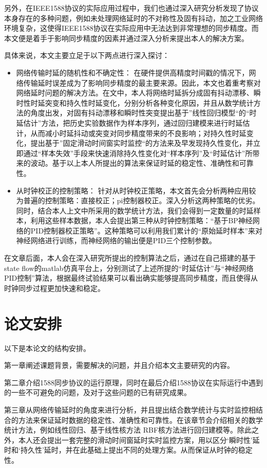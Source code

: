 另外，在IEEE1588协议的实际应用过程中，我们也通过深入研究分析发现了协议本身存在的多种问题，例如未处理网络延时的不对称性及固有抖动，加之工业网络环境复杂，这使得IEEE1588协议在实际应用中无法达到非常理想的同步精度。而本文便是着手于影响同步精度的因素并通过深入分析来提出本人的解决方案。

具体来说，本文主要立足于以下两点进行深入探讨：
\begin{itemize}[noitemsep,topsep=0pt,parsep=0pt,partopsep=0pt]
	\item 网络传输时延的随机性和不确定性：
在硬件提供高精度时间戳的情况下，网络传输延时误差成为了影响同步精度的最主要来源。因此，本文也着重考察对网络延时问题的解决方法。在文中，本人将网络时延拆分成固有抖动漂移、瞬时性时延突变和持久性时延变化，分别分析各种变化原因，并且从数学统计方法的角度出发，对固有抖动漂移和瞬时性突变提出基于”线性回归模型“的“时延估计”方法，把历史实验数据作为样本序列，通过回归建模来进行时延估计，从而减小时延抖动或突变对同步精度带来的不良影响；对持久性时延变化，提出基于”固定滑动时间窗实时监控“的方法来及早发现持久性变化，并立即通过“样本失效”手段来快速消除持久性变化对“样本序列”及“时延估计”所带来的波动。基于以上本人所提出的算法来保证时延的稳定性、准确性和可靠性。
	\item 从时钟校正的控制策略：
针对从时钟校正策略，本文首先会分析两种应用较为普遍的控制策略：直接校正；pi控制器校正。深入分析这两种策略的优劣。同时，结合本人上文中所采用的数学统计方法，我们会得到一定数量的时延样本，利用这些样本数据，本人会提出第三种从时钟控制策略：“基于BP神经网络的PID控制器校正策略”。这种策略可以利用我们累计的“原始延时样本”来对神经网络进行训练，而神经网络的输出便是PID三个控制参数。
\end{itemize}

在文章后面，本人会在深入研究所提出的控制算法之后，通过在自己搭建的基于state flow的matlab仿真平台上，分别测试了上述所提的“时延估计”与“神经网络PID控制”算法，根据最终试验结果可以看出确实能够提高同步精度，而且使得从时钟同步过程更加快速和稳定。

\section{论文安排}
以下是本论文的结构安排。

第一章阐述课题背景，需要解决的问题，并且介绍本文主要研究的内容。

第二章介绍1588同步协议的运行原理，同时在最后介绍1588协议在实际运行中遇到的一些不可避免的问题，及对于这些问题的已有研究成果。

第三章从网络传输延时的角度来进行分析，并且提出结合数学统计与实时监控相结合的方法来保证延时数据的稳定性、准确性和可靠性。在该章节会介绍相关的数学统计方法，例如线性回归、基于线性核方法 RBF核方法进行回归建模等。除此之外，本人还会提出一套完整的滑动时间窗延时实时监控方案，用以区分‘瞬时性’延时和‘持久性’延时，并在此基础上提出不同的处理方案。从而保证从时钟的稳定性。

